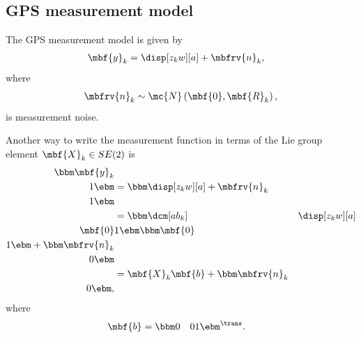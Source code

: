 \documentclass[ nobib, nofonts, notoc]{tufte-handout}
\begin{document}
    \subsection{GPS measurement model}
    The GPS measurement model is given by
    \begin{align}
        \mbf{y}_{k} &= \disp[z_{k}w][a] + \mbfrv{n}_{k},
    \end{align}
    where
    \begin{align}
        \mbfrv{n}_{k}\sim\mc{N}\left( \mbf{0}, \mbf{R}_{k} \right),
    \end{align}
    is measurement noise.

    Another way to write the measurement function in terms of the Lie group element $\mbf{X}_{k}\in SE(2)$ is
    \begin{align}
        \bbm
            \mbf{y}_{k}\\
            1
        \ebm
        &=
        \bbm
        \disp[z_{k}w][a] + \mbfrv{n}_{k}\\
        1
        \ebm\\
        &=
        \bbm
            \dcm[ab_{k}] & \disp[z_{k}w][a] \\
            \mbf{0} & 1
        \ebm
        \bbm
            \mbf{0} \\ 1
        \ebm
        +
        \bbm
            \mbfrv{n}_{k}\\
            0
        \ebm\\
        \label{eq:meas. model GPS Lie group}
        &=
        \mbf{X}_{k}\mbf{b} + \bbm \mbfrv{n}_{k} \\ 0 \ebm,
    \end{align}
    where
    \begin{align}
      \mbf{b}
      &=
      \bbm 0 & 0 & 1 \ebm^{\trans}.
    \end{align}

\end{document}
